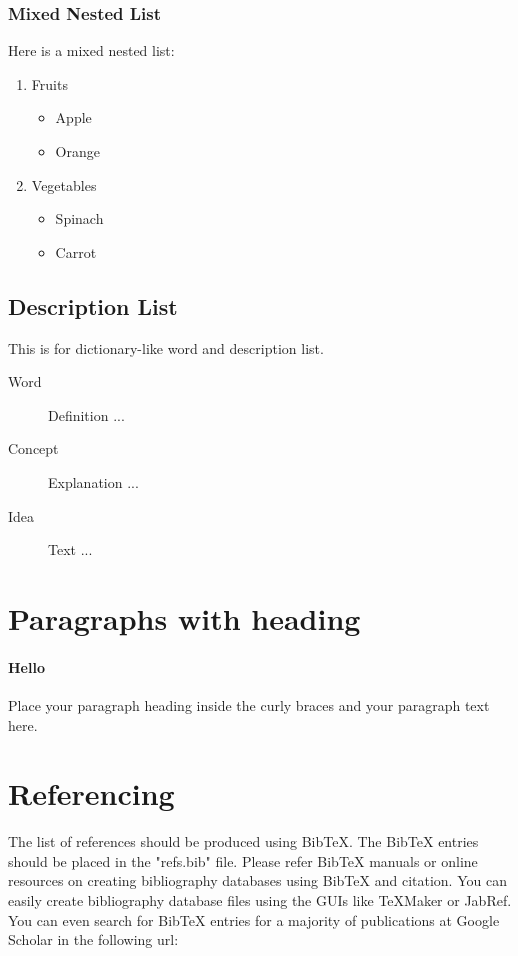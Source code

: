\documentclass[fleqn, 10pt, twoside, blindreview]{IOEGC}
\begin{document}
\subsubsection{Mixed Nested List}
Here is a mixed nested list:
\begin{enumerate}[noitemsep]
  \item Fruits
    \begin{itemize}[noitemsep] 
      \item Apple
      \item Orange
    \end{itemize}
  \item Vegetables
    \begin{itemize}[noitemsep] 
      \item Spinach
      \item Carrot
    \end{itemize}
\end{enumerate}


\subsection{Description List}
This is for dictionary-like word and description list.
\begin{description}
  \item[Word] Definition ...
  \item[Concept] Explanation ...
  \item[Idea] Text ...
\end{description}


\section{Paragraphs with heading}

\paragraph{Hello} Place your paragraph heading inside the curly braces and your 
paragraph text here.


\section{Referencing}
The list of references should be produced using BibTeX. The BibTeX entries 
should be placed in the "refs.bib" file. Please refer BibTeX manuals or online 
resources on creating bibliography databases using BibTeX and citation. You can 
easily create bibliography database files using the GUIs like TeXMaker or JabRef. 
You can even search for BibTeX entries for a majority of publications at Google 
Scholar in the following url: 
\end{document}
